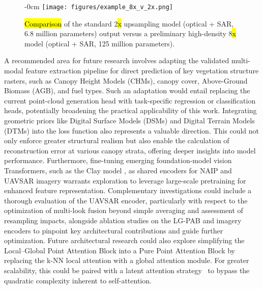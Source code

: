 \documentclass[remotesensing,article,accept,pdftex,moreauthors]{Definitions/mdpi}
\begin{document}
 \vspace{-6pt}

\begin{figure}[H]
    \begin{adjustwidth}{-\extralength}{0cm}
    \centering
    \texttt{[image: figures/example\_8x\_v\_2x.png]}
    \end{adjustwidth}
    \caption{\hl{Comparison} %
 of the standard 2\hl{x} %
 upsampling model (optical + SAR, 6.8 million parameters) output versus a preliminary high-density 8\hl{x} %
 model (optical + SAR, 125 million parameters).}
    \label{fig:upsampling_comparison_8x}
\end{figure}

\newpage

A recommended area for future research involves adapting the validated multi-modal feature extraction pipeline for direct prediction of key vegetation structure rasters, such as Canopy Height Models (CHMs), canopy cover, Above-Ground Biomass (AGB), and fuel types. Such an adaptation would entail replacing the current point-cloud generation head with task-specific regression or classification heads, potentially broadening the practical applicability of this work. Integrating geometric priors like Digital Surface Models (DSMs) and Digital Terrain Models (DTMs) into the loss function also represents a valuable direction. This could not only enforce greater structural realism but also enable the calculation of reconstruction error at various canopy strata, offering deeper insights into model performance. Furthermore, fine-tuning emerging foundation-model vision Transformers, such as the Clay model \cite{clay_model_v1p5}, as shared encoders for NAIP and UAVSAR imagery warrants exploration to leverage large-scale pretraining for enhanced feature representation. Complementary investigations could include a thorough evaluation of the UAVSAR encoder, particularly with respect to the optimization of multi-look fusion beyond simple averaging and assessment of resampling impacts, alongside ablation studies on the LG-PAB and imagery encoders to pinpoint key architectural contributions and guide further optimization. Future architectural research could also explore simplifying the Local--Global Point Attention Block into a Pure Point Attention Block by replacing the k-NN local attention with a global attention module. For greater scalability, this could be paired with a latent attention \mbox{strategy \cite{liu2024deepseek}} to bypass the quadratic complexity inherent to self-attention.
\end{document}
